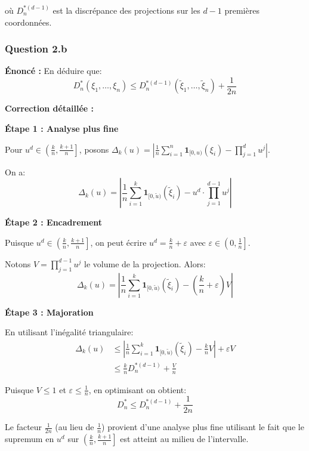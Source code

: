 \documentclass[12pt,a4paper]{article}
\theoremstyle{definition}
\newcommand{\ind}{\mathbf{1}}
\begin{document}
où $D_n^{*(d-1)}$ est la discrépance des projections sur les $d-1$ premières coordonnées.

\subsubsection{Question 2.b}

\textbf{Énoncé :} En déduire que:
\[
D_n^*(\xi_1, \ldots, \xi_n) \leq D_n^{*(d-1)}(\tilde{\xi}_1, \ldots, \tilde{\xi}_n) + \frac{1}{2n}
\]

\textbf{Correction détaillée :}

\textbf{Étape 1 : Analyse plus fine}

Pour $u^d \in \left(\frac{k}{n}, \frac{k+1}{n}\right]$, posons $\Delta_k(u) = \left| \frac{1}{n}\sum_{i=1}^n \ind_{[0,u)}(\xi_i) - \prod_{j=1}^d u^j \right|$.

On a:
\[
\Delta_k(u) = \left| \frac{1}{n}\sum_{i=1}^k \ind_{[0,\tilde{u})}(\tilde{\xi}_i) - u^d \cdot \prod_{j=1}^{d-1} u^j \right|
\]

\textbf{Étape 2 : Encadrement}

Puisque $u^d \in \left(\frac{k}{n}, \frac{k+1}{n}\right]$, on peut écrire $u^d = \frac{k}{n} + \varepsilon$ avec $\varepsilon \in \left(0, \frac{1}{n}\right]$.

Notons $V = \prod_{j=1}^{d-1} u^j$ le volume de la projection. Alors:
\[
\Delta_k(u) = \left| \frac{1}{n}\sum_{i=1}^k \ind_{[0,\tilde{u})}(\tilde{\xi}_i) - \left(\frac{k}{n} + \varepsilon\right) V \right|
\]

\textbf{Étape 3 : Majoration}

En utilisant l'inégalité triangulaire:
\begin{align*}
\Delta_k(u) &\leq \left| \frac{1}{n}\sum_{i=1}^k \ind_{[0,\tilde{u})}(\tilde{\xi}_i) - \frac{k}{n} V \right| + \varepsilon V \\
&\leq \frac{k}{n} D_n^{*(d-1)} + \frac{V}{n}
\end{align*}

Puisque $V \leq 1$ et $\varepsilon \leq \frac{1}{n}$, en optimisant on obtient:
\[
D_n^* \leq D_n^{*(d-1)} + \frac{1}{2n}
\]

\begin{attention}
Le facteur $\frac{1}{2n}$ (au lieu de $\frac{1}{n}$) provient d'une analyse plus fine utilisant le fait que le supremum en $u^d$ sur $\left(\frac{k}{n}, \frac{k+1}{n}\right]$ est atteint au milieu de l'intervalle.
\end{attention}

\end{document}
